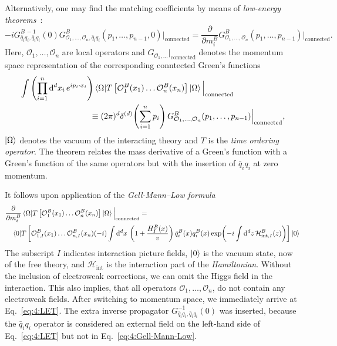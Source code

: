 Alternatively, one may find the matching coefficients by means of \textit{low-energy theorems}~\cite{Kniehl:1994ju, Kniehl:1995tn, Chetyrkin:1997un}:
\begin{equation}
-i G_{\bar{q}_i q_i, \bar{q}_i q_i}^{B\,-1}(0) G_{\mathcal{O}_1,\dots,\mathcal{O}_n, \bar{q}_i q_i}^B(p_1, \ldots, p_{n - 1}, 0)\Big \vert_\text{connected} = \frac{\partial}{\partial m_i^B} G_{\mathcal{O}_1,\dots , \mathcal{O}_n}^B (p_1, \ldots, p_{n - 1})\Big \vert_\text{connected}.
\label{eq:4:LET}
\end{equation}
Here, $\mathcal{O}_1, \ldots , \mathcal{O}_n$ are local operators and $G_{\mathcal{O}_1,\dots} \big \vert_\text{connected}$ denotes the momentum space representation of the corresponding conntected Green's functions
\begin{equation}
\begin{split}
& \int \left(\prod_{i = 1}^n \dd^d x_i \, e^{i p_i\cdot x_i} \right) \braket{\Omega | T \left[ \mathcal{O}_1^B(x_1) \dots \mathcal{O}_n^B(x_n) \right] | \Omega} \Big \vert_\text{connected} \\
& \hspace{3cm} \equiv (2 \pi)^d \delta^{(d)}\! \left(\sum_{i = 1}^n p_i \right) G_{\mathcal{O}_1,\dots, \mathcal{O}_n}^B(p_1, \ldots , p_{n - 1}) \Big \vert_\text{connected},
\end{split}
\end{equation}
$\ket{\Omega}$ denotes the vacuum of the interacting theory and $T$ is the \textit{time ordering operator}. The theorem relates the mass derivative of a Green's function with a Green's function of the same operators but with the insertion of $\bar{q}_i q_i$ at zero momentum.

It follows upon application of the \textit{Gell-Mann--Low formula}
\begin{equation}
\begin{split}
&\frac{\partial}{\partial m_i^B} \braket{\Omega | T \left[ \mathcal{O}_1^B(x_1) \dots \mathcal{O}_n^B(x_n) \right] | \Omega} \Big \vert_\text{connected} =  \\
&\quad \braket{0 | T \left[ \mathcal{O}_{1,I}^B(x_1) \dots \mathcal{O}_{n,I}^B(x_n) (-i) \int \mathrm{d}^d x\, \left( 1 + \frac{H_I^B(x)}{v} \right) \bar{q}_{i}^B(x) q_i^B(x) \exp\!\left(-i \int \mathrm{d}^d z \, \mathcal{H}_{\text{int}, I}^B(z) \right) \right] | 0}
\end{split}
\label{eq:4:Gell-Mann-Low}
\end{equation}
The subscript $I$ indicates interaction picture fields, $\ket{0}$ is the vacuum state, now of the free theory, and $\mathcal{H}_{\text{int}}$ is the interaction part of the \textit{Hamiltonian}.
Without the inclusion of electroweak corrections, we can omit the Higgs field in the interaction. This also implies, that all operators $\mathcal{O}_1, \ldots , \mathcal{O}_n$, do not contain any electroweak fields.
After switching to momentum space, we immediately arrive at Eq.~\eqref{eq:4:LET}. The extra inverse propagator $G_{\bar{q}_i q_i, \bar{q}_i q_i}^{-1}(0)$ was inserted, because the $\bar{q}_i q_i$ operator is considered an external field on the left-hand side of Eq.~\eqref{eq:4:LET} but not in Eq.~\eqref{eq:4:Gell-Mann-Low}.

